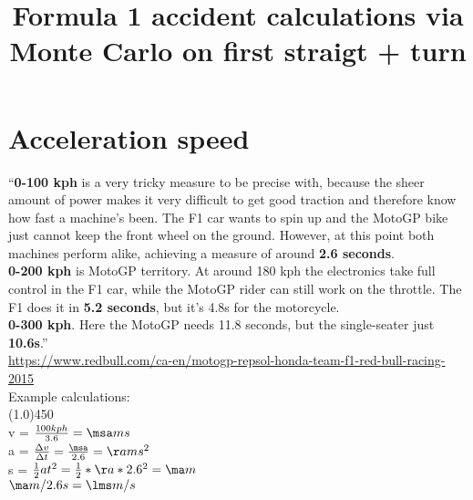 \documentclass{article}
\begin{document}
\title{Formula 1 accident calculations via Monte Carlo on first straigt + turn}
\maketitle

\section{Acceleration speed}

``\textbf{0-100 kph} is a very tricky measure to be precise with, because the sheer amount of power makes it very difficult to get good traction and therefore know how fast a machine's been. The F1 car wants to spin up and the MotoGP bike just cannot keep the front wheel on the ground. However, at this point both machines perform alike, achieving a measure of around \textbf{2.6 seconds}. \\

\noindent
\textbf{0-200 kph} is MotoGP territory. At around 180 kph the electronics take full control in the F1 car, while the MotoGP rider can still work on the throttle. The F1 does it in \textbf{5.2 seconds}, but it's 4.8s for the motorcycle. \\

\noindent
\textbf{0-300 kph}. Here the MotoGP needs 11.8 seconds, but the single-seater just \textbf{10.6s}.''\\
\url{https://www.redbull.com/ca-en/motogp-repsol-honda-team-f1-red-bull-racing-2015} \\

Example calculations: \\
\line(1.0){450} \\

v = $\frac{100kph}{3.6}=\msa ms$\\

\def\time{2.6}
\DIVIDE{\msa}{\time}{\aa}
a = $\frac{\Delta v}{\Delta t} = \frac{\msa}{\time} = \aa ms^2$\\

\SQUARE{\time}{\square}
\MULTIPLY{\aa}{\square}{\tmp}
s = $\frac{1}{2} at^2 = \frac{1}{2} * \aa * \time^2 = \ma m $\\

\DIVIDE{\ma}{\time}{\lms}
$\ma m / \time s = \lms m/s$\\
\end{document}
